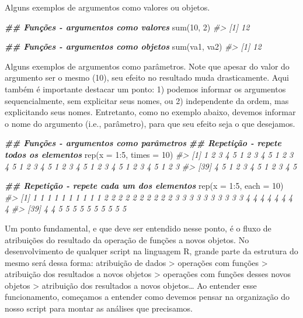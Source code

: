 \documentclass[
]{book}
\newenvironment{Shaded}{\begin{snugshade}}{\end{snugshade}}
\newcommand{\AttributeTok}[1]{\textcolor[rgb]{0.61,0.61,0.61}{#1}}
\newcommand{\CommentTok}[1]{\textcolor[rgb]{0.37,0.37,0.37}{\textit{#1}}}
\newcommand{\DecValTok}[1]{\textcolor[rgb]{0.06,0.06,0.06}{#1}}
\newcommand{\DocumentationTok}[1]{\textcolor[rgb]{0.37,0.37,0.37}{\textbf{\textit{#1}}}}
\newcommand{\FunctionTok}[1]{\textcolor[rgb]{0,0,0}{#1}}
\newcommand{\NormalTok}[1]{#1}
\newcommand{\SpecialCharTok}[1]{\textcolor[rgb]{0,0,0}{#1}}
\begin{document}
Alguns exemplos de argumentos como valores ou objetos.

\begin{Shaded}
\begin{Highlighting}[]
\DocumentationTok{\#\# Funções {-} argumentos como valores}
\FunctionTok{sum}\NormalTok{(}\DecValTok{10}\NormalTok{, }\DecValTok{2}\NormalTok{)}
\CommentTok{\#\textgreater{} [1] 12}

\DocumentationTok{\#\# Funções {-} argumentos como objetos}
\FunctionTok{sum}\NormalTok{(va1, va2)}
\CommentTok{\#\textgreater{} [1] 12}
\end{Highlighting}
\end{Shaded}

Alguns exemplos de argumentos como parâmetros. Note que apesar do valor do argumento ser o mesmo (10), seu efeito no resultado muda drasticamente. Aqui também é importante destacar um ponto: 1) podemos informar os argumentos sequencialmente, sem explicitar seus nomes, ou 2) independente da ordem, mas explicitando seus nomes. Entretanto, como no exemplo abaixo, devemos informar o nome do argumento (i.e., parâmetro), para que seu efeito seja o que desejamos.

\begin{Shaded}
\begin{Highlighting}[]
\DocumentationTok{\#\# Funções {-} argumentos como parâmetros}
\DocumentationTok{\#\# Repetição {-} repete todos os elementos}
\FunctionTok{rep}\NormalTok{(}\AttributeTok{x =} \DecValTok{1}\SpecialCharTok{:}\DecValTok{5}\NormalTok{, }\AttributeTok{times =} \DecValTok{10}\NormalTok{)}
\CommentTok{\#\textgreater{}  [1] 1 2 3 4 5 1 2 3 4 5 1 2 3 4 5 1 2 3 4 5 1 2 3 4 5 1 2 3 4 5 1 2 3 4 5 1 2 3}
\CommentTok{\#\textgreater{} [39] 4 5 1 2 3 4 5 1 2 3 4 5}

\DocumentationTok{\#\# Repetição {-} repete cada um dos elementos}
\FunctionTok{rep}\NormalTok{(}\AttributeTok{x =} \DecValTok{1}\SpecialCharTok{:}\DecValTok{5}\NormalTok{, }\AttributeTok{each =} \DecValTok{10}\NormalTok{)}
\CommentTok{\#\textgreater{}  [1] 1 1 1 1 1 1 1 1 1 1 2 2 2 2 2 2 2 2 2 2 3 3 3 3 3 3 3 3 3 3 4 4 4 4 4 4 4 4}
\CommentTok{\#\textgreater{} [39] 4 4 5 5 5 5 5 5 5 5 5 5}
\end{Highlighting}
\end{Shaded}

Um ponto fundamental, e que deve ser entendido nesse ponto, é o fluxo de atribuições do resultado da operação de funções a novos objetos. No desenvolvimento de qualquer script na linguagem R, grande parte da estrutura do mesmo será dessa forma: atribuição de dados \textgreater{} operações com funções \textgreater{} atribuição dos resultados a novos objetos \textgreater{} operações com funções desses novos objetos \textgreater{} atribuição dos resultados a novos objetos\ldots{} Ao entender esse funcionamento, começamos a entender como devemos pensar na organização do nosso script para montar as análises que precisamos.
\end{document}
